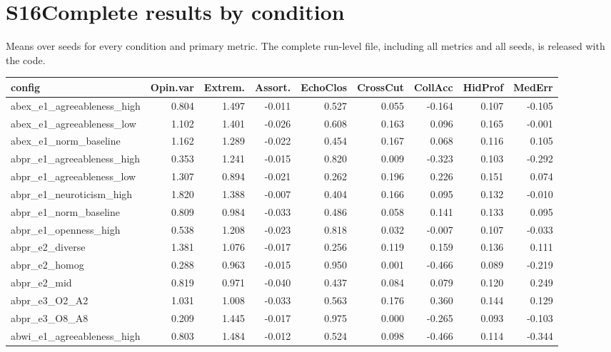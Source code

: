 \documentclass[11pt]{article}
\begin{document}
\medskip

\section*{S16\quad Complete results by condition}
Means over seeds for every condition and primary metric. The complete run-level file, including all metrics and all seeds, is released with the code.
\begin{landscape}
\tiny
\setlength{\tabcolsep}{2.5pt}
\begin{longtable}{@{}lrrrrrrrr@{}}
\toprule
config & Opin.var & Extrem. & Assort. & EchoClos & CrossCut & CollAcc & HidProf & MedErr \\
\midrule
\endhead
abex\_e1\_agreeableness\_high & 0.804 & 1.497 & -0.011 & 0.527 & 0.055 & -0.164 & 0.107 & -0.105 \\
abex\_e1\_agreeableness\_low & 1.102 & 1.401 & -0.026 & 0.608 & 0.163 & 0.096 & 0.165 & -0.001 \\
abex\_e1\_norm\_baseline & 1.162 & 1.289 & -0.022 & 0.454 & 0.167 & 0.068 & 0.116 & 0.105 \\
abpr\_e1\_agreeableness\_high & 0.353 & 1.241 & -0.015 & 0.820 & 0.009 & -0.323 & 0.103 & -0.292 \\
abpr\_e1\_agreeableness\_low & 1.307 & 0.894 & -0.021 & 0.262 & 0.196 & 0.226 & 0.151 & 0.074 \\
abpr\_e1\_neuroticism\_high & 1.820 & 1.388 & -0.007 & 0.404 & 0.166 & 0.095 & 0.132 & -0.010 \\
abpr\_e1\_norm\_baseline & 0.809 & 0.984 & -0.033 & 0.486 & 0.058 & 0.141 & 0.133 & 0.095 \\
abpr\_e1\_openness\_high & 0.538 & 1.208 & -0.023 & 0.818 & 0.032 & -0.007 & 0.107 & -0.033 \\
abpr\_e2\_diverse & 1.381 & 1.076 & -0.017 & 0.256 & 0.119 & 0.159 & 0.136 & 0.111 \\
abpr\_e2\_homog & 0.288 & 0.963 & -0.015 & 0.950 & 0.001 & -0.466 & 0.089 & -0.219 \\
abpr\_e2\_mid & 0.819 & 0.971 & -0.040 & 0.437 & 0.084 & 0.079 & 0.120 & 0.249 \\
abpr\_e3\_O2\_A2 & 1.031 & 1.008 & -0.033 & 0.563 & 0.176 & 0.360 & 0.144 & 0.129 \\
abpr\_e3\_O8\_A8 & 0.209 & 1.445 & -0.017 & 0.975 & 0.000 & -0.265 & 0.093 & -0.103 \\
abwi\_e1\_agreeableness\_high & 0.803 & 1.484 & -0.012 & 0.524 & 0.098 & -0.466 & 0.114 & -0.344 \\

\end{longtable}
\end{landscape}
\end{document}
